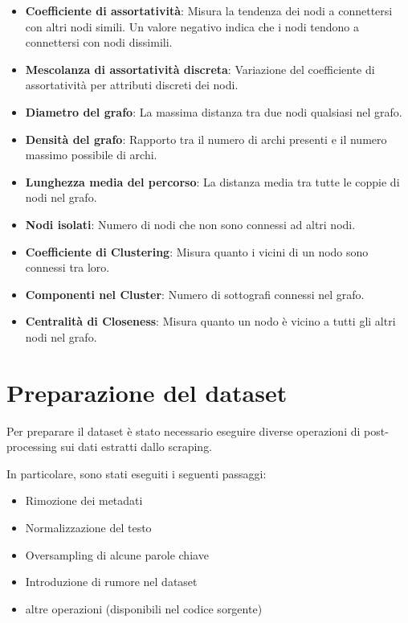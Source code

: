 \begin{itemize}
      \item \textbf{Coefficiente di assortatività}: Misura la tendenza dei nodi a connettersi con altri nodi simili.
            Un valore negativo indica che i nodi tendono a connettersi
            con nodi dissimili.
      \item \textbf{Mescolanza di assortatività discreta}: Variazione del coefficiente di assortatività per attributi discreti dei nodi.
      \item \textbf{Diametro del grafo}: La massima distanza tra due nodi qualsiasi nel grafo.
      \item \textbf{Densità del grafo}: Rapporto tra il numero di archi presenti e il numero massimo possibile di archi.
      \item \textbf{Lunghezza media del percorso}: La distanza media tra tutte le coppie di nodi nel grafo.
      \item \textbf{Nodi isolati}: Numero di nodi che non sono connessi ad altri nodi.
      \item \textbf{Coefficiente di Clustering}: Misura quanto i vicini di un nodo sono connessi tra loro.
      \item \textbf{Componenti nel Cluster}: Numero di sottografi connessi nel grafo.
      \item \textbf{Centralità di Closeness}: Misura quanto un nodo è vicino a tutti gli altri nodi nel grafo.
\end{itemize}

\section{Preparazione del dataset}
\label{sec:dataset_prep}
Per preparare il dataset è stato necessario eseguire
diverse operazioni di post-processing sui dati estratti
dallo scraping.

In particolare, sono stati eseguiti i seguenti passaggi:
\begin{itemize}
      \item Rimozione dei metadati
      \item Normalizzazione del testo
      \item Oversampling di alcune parole chiave
      \item Introduzione di rumore nel dataset
      \item altre operazioni (disponibili nel codice sorgente\cite{af64_spoiler_filter})
\end{itemize}

